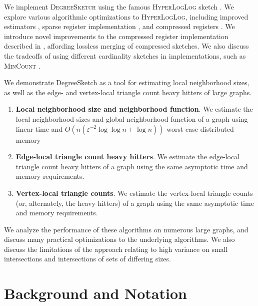 \documentclass[10]{article}
\newcommand{\algoname}[1]{\textnormal{\textsc{#1}}}
\begin{document}
We implement \algoname{DegreeSketch} using the famous \algoname{HyperLogLog} sketch \cite{flajolet2007hyperloglog}. 
We explore various algorithmic optimizations to \algoname{HyperLogLog}, including improved estimators \cite{heule2013hyperloglog, qin2016loglog, lang2017back, ertl2017new}, sparse register implementation \cite{heule2013hyperloglog}, and compressed registers \cite{xiao2017better}.
We introduce novel improvements to the compressed register implementation described in \cite{xiao2017better}, affording lossless merging of compressed sketches.
We also discuss the tradeoffs of using different cardinality sketches in implementations, such as \algoname{MinCount} \cite{giroire2009order}.

We demonstrate DegreeSketch as a tool for estimating local neighborhood sizes, as well as the edge- and vertex-local triangle count heavy hitters of large graphs. 
%
\begin{enumerate}
	\item \textbf{Local neighborhood size and neighborhood function}. We estimate the local neighborhood sizes and global neighborhood function of a graph using linear time and $O(n (\varepsilon^{-2} \log\log n + \log n))$ worst-case distributed memory
	\item \textbf{Edge-local triangle count heavy hitters}. We estimate the edge-local triangle count heavy hitters of a graph using the same asymptotic time and memory requirements.
	\item \textbf{Vertex-local triangle counts}. We estimate the vertex-local triangle counts (or, alternately, the heavy hitters) of a graph using the same asymptotic time and memory requirements.
\end{enumerate}
%
We analyze the performance of these algorithms on numerous large graphs, and discuss many practical optimizations to the underlying algorithms. 
We also discuss the limitations of the approach relating to high variance on small intersections and intersections of sets of differing sizes.


\section{Background and Notation} \label{chap:background}
\end{document}
